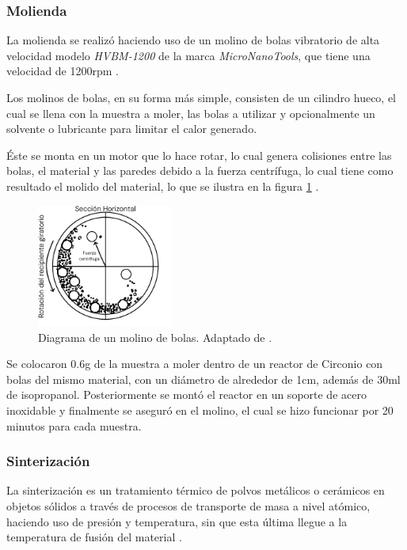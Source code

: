 \documentclass[../main.tex]{subfiles}
\begin{document}
\subsubsection{Molienda} \label{sec:molienda}
La molienda se realizó haciendo uso de un molino de bolas vibratorio de alta velocidad modelo \textit{HVBM-1200} de la marca \textit{MicroNanoTools}, que tiene una velocidad de 1200rpm \cite{Molino}.

Los molinos de bolas, en su forma más simple, consisten de un cilindro hueco, el cual se llena con la muestra a moler, las bolas a utilizar y opcionalmente un solvente o lubricante para limitar el calor generado.

Éste se monta en un motor que lo hace rotar, lo cual genera colisiones entre las bolas, el material y las paredes debido a la fuerza centrífuga, lo cual tiene como resultado el molido del material, lo que se ilustra en la figura \ref{fig:molinodiag} \cite{Baheti2012}.
\begin{figure}[H]
    \centering
    \includegraphics[width=0.4\textwidth]{fig/molinodiag.png}
    \caption{Diagrama de un molino de bolas. Adaptado de \cite{Baheti2012}.}
    \label{fig:molinodiag}
\end{figure}
Se colocaron 0.6g de la muestra a moler dentro de un reactor de Circonio con bolas del mismo material, con un diámetro de alrededor de 1cm, además de 30ml de isopropanol. Posteriormente se montó el reactor en un soporte de acero inoxidable y finalmente se aseguró en el molino, el cual se hizo funcionar por 20 minutos para cada muestra.

\subsubsection{Sinterización} \label{sec:sinter}
La sinterización es un tratamiento térmico de polvos metálicos o cerámicos en objetos sólidos a través de procesos de transporte de masa a nivel atómico, haciendo uso de presión y temperatura, sin que esta última llegue a la temperatura de fusión del material \cite{Banerjee2019}.
\end{document}

